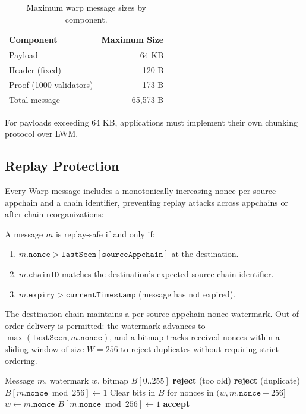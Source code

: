 \begin{table}[H]
\centering
\caption{Maximum warp message sizes by component.}
\label{tab:sizelimits}
\begin{tabular}{lr}
\toprule
\textbf{Component} & \textbf{Maximum Size} \\
\midrule
Payload & 64 KB \\
Header (fixed) & 120 B \\
Proof (1000 validators) & 173 B \\
Total message & 65,573 B \\
\bottomrule
\end{tabular}
\end{table}

For payloads exceeding 64 KB, applications must implement their own chunking protocol over LWM.

\subsection{Replay Protection}

Every Warp message includes a monotonically increasing nonce per source appchain and a chain identifier, preventing replay attacks across appchains or after chain reorganizations:

\begin{definition}
A message $m$ is replay-safe if and only if:
\begin{enumerate}
    \item $m.\texttt{nonce} > \texttt{lastSeen}[\texttt{sourceAppchain}]$ at the destination.
    \item $m.\texttt{chainID}$ matches the destination's expected source chain identifier.
    \item $m.\texttt{expiry} > \texttt{currentTimestamp}$ (message has not expired).
\end{enumerate}
The destination chain maintains a per-source-appchain nonce watermark. Out-of-order delivery is permitted: the watermark advances to $\max(\texttt{lastSeen}, m.\texttt{nonce})$, and a bitmap tracks received nonces within a sliding window of size $W = 256$ to reject duplicates without requiring strict ordering.
\end{definition}

\begin{algorithm}
\caption{Nonce Verification with Bitmap}
\begin{algorithmic}[1]
\Require Message $m$, watermark $w$, bitmap $B[0..255]$
    \State \Return \textbf{reject} (too old)
\EndIf
{}
        \State \Return \textbf{reject} (duplicate)
    \EndIf
    \State $B[m.\texttt{nonce} \bmod 256] \gets 1$
\Else
    \State Clear bits in $B$ for nonces in $(w, m.\texttt{nonce} - 256]$
    \State $w \gets m.\texttt{nonce}$
    \State $B[m.\texttt{nonce} \bmod 256] \gets 1$
\EndIf
\State \Return \textbf{accept}
\end{algorithmic}
\end{algorithm}

